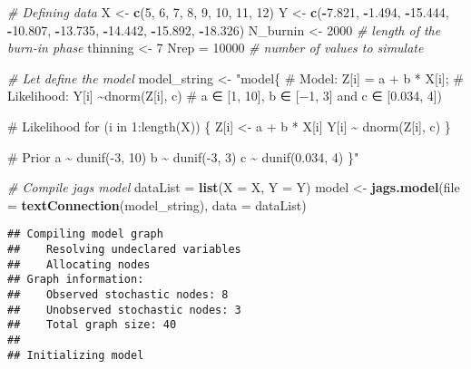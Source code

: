 \documentclass[
]{article}
\newenvironment{Shaded}{\begin{snugshade}}{\end{snugshade}}
\newcommand{\AttributeTok}[1]{\textcolor[rgb]{0.13,0.29,0.53}{#1}}
\newcommand{\CommentTok}[1]{\textcolor[rgb]{0.56,0.35,0.01}{\textit{#1}}}
\newcommand{\DecValTok}[1]{\textcolor[rgb]{0.00,0.00,0.81}{#1}}
\newcommand{\FloatTok}[1]{\textcolor[rgb]{0.00,0.00,0.81}{#1}}
\newcommand{\FunctionTok}[1]{\textcolor[rgb]{0.13,0.29,0.53}{\textbf{#1}}}
\newcommand{\NormalTok}[1]{#1}
\newcommand{\OtherTok}[1]{\textcolor[rgb]{0.56,0.35,0.01}{#1}}
\newcommand{\SpecialCharTok}[1]{\textcolor[rgb]{0.81,0.36,0.00}{\textbf{#1}}}
\newcommand{\StringTok}[1]{\textcolor[rgb]{0.31,0.60,0.02}{#1}}
\begin{document}
\begin{Shaded}
\begin{Highlighting}[]
\CommentTok{\# Defining data}
\NormalTok{X }\OtherTok{\textless{}{-}} \FunctionTok{c}\NormalTok{(}\DecValTok{5}\NormalTok{, }\DecValTok{6}\NormalTok{, }\DecValTok{7}\NormalTok{, }\DecValTok{8}\NormalTok{, }\DecValTok{9}\NormalTok{, }\DecValTok{10}\NormalTok{, }\DecValTok{11}\NormalTok{, }\DecValTok{12}\NormalTok{)}
\NormalTok{Y }\OtherTok{\textless{}{-}} \FunctionTok{c}\NormalTok{(}\SpecialCharTok{{-}}\FloatTok{7.821}\NormalTok{, }\SpecialCharTok{{-}}\FloatTok{1.494}\NormalTok{, }\SpecialCharTok{{-}}\FloatTok{15.444}\NormalTok{, }\SpecialCharTok{{-}}\FloatTok{10.807}\NormalTok{, }\SpecialCharTok{{-}}\FloatTok{13.735}\NormalTok{, }\SpecialCharTok{{-}}\FloatTok{14.442}\NormalTok{, }\SpecialCharTok{{-}}\FloatTok{15.892}\NormalTok{, }\SpecialCharTok{{-}}\FloatTok{18.326}\NormalTok{) }
\NormalTok{N\_burnin }\OtherTok{\textless{}{-}} \DecValTok{2000} \CommentTok{\# length of the burn{-}in phase }
\NormalTok{thinning }\OtherTok{\textless{}{-}} \DecValTok{7}
\NormalTok{Nrep }\OtherTok{=} \DecValTok{10000}     \CommentTok{\# number of values to simulate}

\CommentTok{\# Let\textquotesingle{} define the model}
\NormalTok{model\_string }\OtherTok{\textless{}{-}} \StringTok{"model\{}
\StringTok{  }
\StringTok{  \# Model: Z[i] = a + b * X[i];}
\StringTok{  \# Likelihood: Y[i] \textasciitilde{}dnorm(Z[i], c)}
\StringTok{  \# a ∈ [1, 10], b ∈ [−1, 3] and c ∈ [0.034, 4]) }

\StringTok{  \# Likelihood}
\StringTok{  for (i in 1:length(X)) \{}
\StringTok{    Z[i] \textless{}{-} a + b * X[i]}
\StringTok{    Y[i] \textasciitilde{} dnorm(Z[i], c)}
\StringTok{  \}}

\StringTok{  \# Prior}
\StringTok{  a \textasciitilde{} dunif({-}3, 10)}
\StringTok{  b \textasciitilde{} dunif({-}3, 3)}
\StringTok{  c \textasciitilde{} dunif(0.034, 4)}
\StringTok{  }
\StringTok{\}"}

\CommentTok{\# Compile jags model}
\NormalTok{dataList }\OtherTok{=} \FunctionTok{list}\NormalTok{(}\AttributeTok{X =}\NormalTok{ X, }\AttributeTok{Y =}\NormalTok{ Y)}
\NormalTok{model }\OtherTok{\textless{}{-}} \FunctionTok{jags.model}\NormalTok{(}\AttributeTok{file =} \FunctionTok{textConnection}\NormalTok{(model\_string), }
                    \AttributeTok{data =}\NormalTok{ dataList)}
\end{Highlighting}
\end{Shaded}

\begin{verbatim}
## Compiling model graph
##    Resolving undeclared variables
##    Allocating nodes
## Graph information:
##    Observed stochastic nodes: 8
##    Unobserved stochastic nodes: 3
##    Total graph size: 40
## 
## Initializing model
\end{verbatim}
\end{document}
